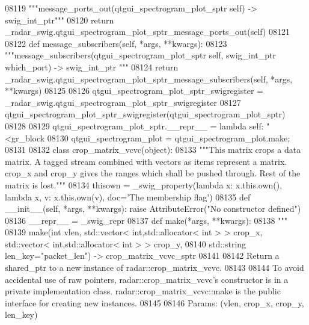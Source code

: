 \begin{DoxyCode}
{{{{{{{{{{{{{{{{{{{{{{{{{{08119         \textcolor{stringliteral}{"""message\_ports\_out(qtgui\_spectrogram\_plot\_sptr self) -> swig\_int\_ptr"""}
08120         \textcolor{keywordflow}{return} \_radar\_swig.qtgui\_spectrogram\_plot\_sptr\_message\_ports\_out(self)
08121 
08122     \textcolor{keyword}{def }message_subscribers(self, *args, **kwargs):
08123         \textcolor{stringliteral}{"""message\_subscribers(qtgui\_spectrogram\_plot\_sptr self, swig\_int\_ptr which\_port) -> swig\_int\_ptr
      """}
08124         \textcolor{keywordflow}{return} \_radar\_swig.qtgui\_spectrogram\_plot\_sptr\_message\_subscribers(self, *args, **kwargs)
08125 
08126 qtgui\_spectrogram\_plot\_sptr\_swigregister = \_radar\_swig.qtgui\_spectrogram\_plot\_sptr\_swigregister
08127 qtgui_spectrogram_plot_sptr_swigregister(qtgui\_spectrogram\_plot\_sptr)
08128 
08129 qtgui\_spectrogram\_plot\_sptr.\_\_repr\_\_ = \textcolor{keyword}{lambda} self: \textcolor{stringliteral}{"<gr\_block %
08130 qtgui\_spectrogram\_plot = qtgui\_spectrogram\_plot.make;
08131 
08132 \textcolor{keyword}{class }crop_matrix_vcvc(object):
08133     \textcolor{stringliteral}{"""This matrix crops a data matrix. A tagged stream combined with vectors as items represent a matrix.
       crop\_x and crop\_y gives the ranges which shall be pushed through. Rest of the matrix is lost."""}
08134     thisown = _swig_property(\textcolor{keyword}{lambda} x: x.this.own(), \textcolor{keyword}{lambda} x, v: x.this.own(v), doc=\textcolor{stringliteral}{'The membership flag'})
08135     \textcolor{keyword}{def }__init__(self, *args, **kwargs): \textcolor{keywordflow}{raise} AttributeError(\textcolor{stringliteral}{"No constructor defined"})
08136     \_\_repr\_\_ = \_swig\_repr
08137     \textcolor{keyword}{def }make(*args, **kwargs):
08138         \textcolor{stringliteral}{"""}
08139 \textcolor{stringliteral}{        make(int vlen, std::vector< int,std::allocator< int > > crop\_x, std::vector< int,std::allocator<
       int > > crop\_y, }
08140 \textcolor{stringliteral}{            std::string len\_key="packet\_len") -> crop\_matrix\_vcvc\_sptr}
08141 \textcolor{stringliteral}{}
08142 \textcolor{stringliteral}{        Return a shared\_ptr to a new instance of radar::crop\_matrix\_vcvc.}
08143 \textcolor{stringliteral}{}
08144 \textcolor{stringliteral}{        To avoid accidental use of raw pointers, radar::crop\_matrix\_vcvc's constructor is in a private
       implementation class. radar::crop\_matrix\_vcvc::make is the public interface for creating new instances.}
08145 \textcolor{stringliteral}{}
08146 \textcolor{stringliteral}{        Params: (vlen, crop\_x, crop\_y, len\_key)}
}}}}}}}}}}}}}}}}}}}}}}}}}}}
\end{DoxyCode}
